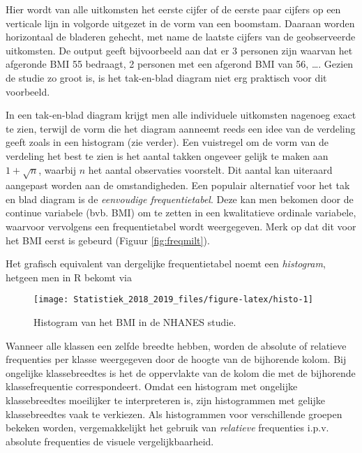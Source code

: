 \documentclass[12pt,dutch,coursenotes]{book}
\newenvironment{Shaded}{\begin{snugshade}}{\end{snugshade}}
\newcommand{\KeywordTok}[1]{\textcolor[rgb]{0.13,0.29,0.53}{\textbf{#1}}}
\newcommand{\DataTypeTok}[1]{\textcolor[rgb]{0.13,0.29,0.53}{#1}}
\newcommand{\StringTok}[1]{\textcolor[rgb]{0.31,0.60,0.02}{#1}}
\newcommand{\CommentTok}[1]{\textcolor[rgb]{0.56,0.35,0.01}{\textit{#1}}}
\newcommand{\OperatorTok}[1]{\textcolor[rgb]{0.81,0.36,0.00}{\textbf{#1}}}
\newcommand{\NormalTok}[1]{#1}
\theoremstyle{definition}
\theoremstyle{definition}
\theoremstyle{definition}
\theoremstyle{remark}
\begin{document}
Hier wordt van alle uitkomsten het eerste cijfer of de eerste paar
cijfers op een verticale lijn in volgorde uitgezet in de vorm van een
boomstam. Daaraan worden horizontaal de bladeren gehecht, met name de
laatste cijfers van de geobserveerde uitkomsten. De output geeft
bijvoorbeeld aan dat er 3 personen zijn waarvan het afgeronde BMI 55
bedraagt, 2 personen met een afgerond BMI van 56, \ldots{}. Gezien de
studie zo groot is, is het tak-en-blad diagram niet erg praktisch voor
dit voorbeeld.

In een tak-en-blad diagram krijgt men alle individuele uitkomsten
nagenoeg exact te zien, terwijl de vorm die het diagram aanneemt reeds
een idee van de verdeling geeft zoals in een histogram (zie verder). Een
vuistregel om de vorm van de verdeling het best te zien is het aantal
takken ongeveer gelijk te maken aan \(1 + \sqrt{n}\), waarbij \(n\) het
aantal observaties voorstelt. Dit aantal kan uiteraard aangepast worden
aan de omstandigheden. Een populair alternatief voor het tak en blad
diagram is de \emph{eenvoudige frequentietabel}. Deze kan men bekomen
door de continue variabele (bvb. BMI) om te zetten in een kwalitatieve
ordinale variabele, waarvoor vervolgens een frequentietabel wordt
weergegeven. Merk op dat dit voor het BMI eerst is gebeurd (Figuur
\ref{fig:freqmilt}).

Het grafisch equivalent van dergelijke frequentietabel noemt een
\emph{histogram}, hetgeen men in R bekomt via

\begin{Shaded}
\end{Shaded}

\begin{figure}

{\centering \texttt{[image: Statistiek\_2018\_2019\_files/figure-latex/histo-1]} 

}

\caption{Histogram van het BMI in de NHANES studie.}\label{fig:histo}
\end{figure}

Wanneer alle klassen een zelfde breedte hebben, worden de absolute of
relatieve frequenties per klasse weergegeven door de hoogte van de
bijhorende kolom. Bij ongelijke klassebreedtes is het de oppervlakte van
de kolom die met de bijhorende klassefrequentie correspondeert. Omdat
een histogram met ongelijke klassebreedtes moeilijker te interpreteren
is, zijn histogrammen met gelijke klassebreedtes vaak te verkiezen. Als
histogrammen voor verschillende groepen bekeken worden, vergemakkelijkt
het gebruik van \emph{relatieve} frequenties i.p.v. absolute frequenties
de visuele vergelijkbaarheid.
\end{document}
